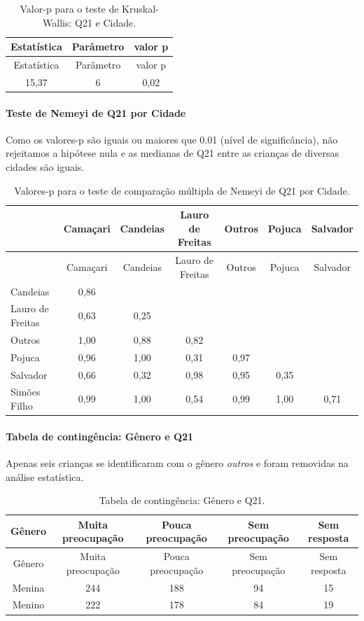 \documentclass[]{article}
\let\oldparagraph\paragraph
\renewcommand{\paragraph}[1]{\oldparagraph{#1}\mbox{}}
\begin{document}
\begin{longtable}[]{@{}ccc@{}}
\caption{\label{tab:unnamed-chunk-433}Valor-p para o teste de Kruskal-Wallis: Q21 e Cidade.}\tabularnewline
\toprule
Estatística & Parâmetro & valor p\tabularnewline
\midrule
\endfirsthead
\toprule
Estatística & Parâmetro & valor p\tabularnewline
\midrule
\endhead
15,37 & 6 & 0,02\tabularnewline
\bottomrule
\end{longtable}

\hypertarget{teste-de-nemeyi-de-q21-por-cidade}{%
\paragraph{Teste de Nemeyi de Q21 por Cidade}\label{teste-de-nemeyi-de-q21-por-cidade}}

Como os valores-p são iguais ou maiores que 0.01 (nível de significância), não rejeitamos a hipótese nula e as medianas de Q21 entre as crianças de diversas cidades são iguais.

\begin{longtable}[]{@{}lcccccc@{}}
\caption{\label{tab:unnamed-chunk-435}Valores-p para o teste de comparação múltipla de Nemeyi de Q21 por Cidade.}\tabularnewline
\toprule
& Camaçari & Candeias & Lauro de Freitas & Outros & Pojuca & Salvador\tabularnewline
\midrule
\endfirsthead
\toprule
& Camaçari & Candeias & Lauro de Freitas & Outros & Pojuca & Salvador\tabularnewline
\midrule
\endhead
Candeias & 0,86 & & & & &\tabularnewline
Lauro de Freitas & 0,63 & 0,25 & & & &\tabularnewline
Outros & 1,00 & 0,88 & 0,82 & & &\tabularnewline
Pojuca & 0,96 & 1,00 & 0,31 & 0,97 & &\tabularnewline
Salvador & 0,66 & 0,32 & 0,98 & 0,95 & 0,35 &\tabularnewline
Simões Filho & 0,99 & 1,00 & 0,54 & 0,99 & 1,00 & 0,71\tabularnewline
\bottomrule
\end{longtable}

\cleardoublepage

\hypertarget{tabela-de-continguxeancia-guxeanero-e-q21}{%
\paragraph{Tabela de contingência: Gênero e Q21}\label{tabela-de-continguxeancia-guxeanero-e-q21}}

Apenas seis crianças se identificaram com o gênero \emph{outros} e foram removidas na análise estatística.

\begin{longtable}[]{@{}ccccc@{}}
\caption{\label{tab:unnamed-chunk-436}Tabela de contingência: Gênero e Q21.}\tabularnewline
\toprule
Gênero & Muita preocupação & Pouca preocupação & Sem preocupação & Sem resposta\tabularnewline
\midrule
\endfirsthead
\toprule
Gênero & Muita preocupação & Pouca preocupação & Sem preocupação & Sem resposta\tabularnewline
\midrule
\endhead
Menina & 244 & 188 & 94 & 15\tabularnewline
Menino & 222 & 178 & 84 & 19\tabularnewline
\bottomrule
\end{longtable}
\end{document}
